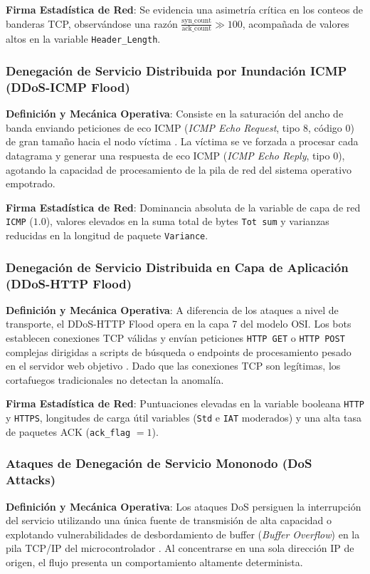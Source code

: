 \textbf{Firma Estadística de Red}: Se evidencia una asimetría crítica en los conteos de banderas TCP, observándose una razón $\frac{\text{syn\_count}}{\text{ack\_count}} \gg 100$, acompañada de valores altos en la variable \texttt{Header\_Length}.

\subsubsection{Denegación de Servicio Distribuida por Inundación ICMP (DDoS-ICMP Flood)}
\textbf{Definición y Mecánica Operativa}: Consiste en la saturación del ancho de banda enviando peticiones de eco ICMP (\textit{ICMP Echo Request}, tipo 8, código 0) de gran tamaño hacia el nodo víctima \citep{kumar2023}. La víctima se ve forzada a procesar cada datagrama y generar una respuesta de eco ICMP (\textit{ICMP Echo Reply}, tipo 0), agotando la capacidad de procesamiento de la pila de red del sistema operativo empotrado.

\textbf{Firma Estadística de Red}: Dominancia absoluta de la variable de capa de red \texttt{ICMP} ($1.0$), valores elevados en la suma total de bytes \texttt{Tot sum} y varianzas reducidas en la longitud de paquete \texttt{Variance}.

\subsubsection{Denegación de Servicio Distribuida en Capa de Aplicación (DDoS-HTTP Flood)}
\textbf{Definición y Mecánica Operativa}: A diferencia de los ataques a nivel de transporte, el DDoS-HTTP Flood opera en la capa 7 del modelo OSI. Los bots establecen conexiones TCP válidas y envían peticiones \texttt{HTTP GET} o \texttt{HTTP POST} complejas dirigidas a scripts de búsqueda o endpoints de procesamiento pesado en el servidor web objetivo \citep{hassan2025}. Dado que las conexiones TCP son legítimas, los cortafuegos tradicionales no detectan la anomalía.

\textbf{Firma Estadística de Red}: Puntuaciones elevadas en la variable booleana \texttt{HTTP} y \texttt{HTTPS}, longitudes de carga útil variables (\texttt{Std} e \texttt{IAT} moderados) y una alta tasa de paquetes ACK (\texttt{ack\_flag} $= 1$).

\subsubsection{Ataques de Denegación de Servicio Mononodo (DoS Attacks)}
\textbf{Definición y Mecánica Operativa}: Los ataques DoS persiguen la interrupción del servicio utilizando una única fuente de transmisión de alta capacidad o explotando vulnerabilidades de desbordamiento de buffer (\textit{Buffer Overflow}) en la pila TCP/IP del microcontrolador \citep{albulayhi2022}. Al concentrarse en una sola dirección IP de origen, el flujo presenta un comportamiento altamente determinista.

